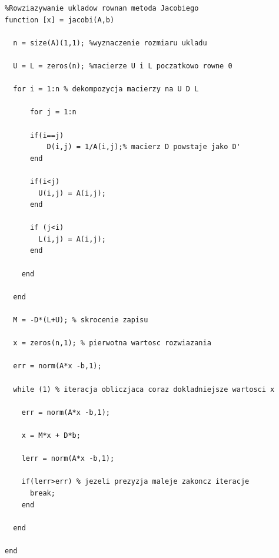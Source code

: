 \documentclass[a4paper, 11pt]{article}
\begin{document}
\begin{lstlisting}
%Rowziazywanie ukladow rownan metoda Jacobiego
function [x] = jacobi(A,b)
 
  n = size(A)(1,1); %wyznaczenie rozmiaru ukladu
   
  U = L = zeros(n); %macierze U i L poczatkowo rowne 0
  
  for i = 1:n % dekompozycja macierzy na U D L
    
      for j = 1:n
      
      if(i==j)
          D(i,j) = 1/A(i,j);% macierz D powstaje jako D'    
      end
      
      if(i<j)
        U(i,j) = A(i,j);
      end
      
      if (j<i)
        L(i,j) = A(i,j);
      end
    
    end
  
  end
  
  M = -D*(L+U); % skrocenie zapisu
  
  x = zeros(n,1); % pierwotna wartosc rozwiazania
  
  err = norm(A*x -b,1); 
  
  while (1) % iteracja obliczjaca coraz dokladniejsze wartosci x
  
    err = norm(A*x -b,1);
  
    x = M*x + D*b;
   
    lerr = norm(A*x -b,1);
    
    if(lerr>err) % jezeli prezyzja maleje zakoncz iteracje
      break;
    end
   
  end
  
end

\end{lstlisting}
\end{document}
